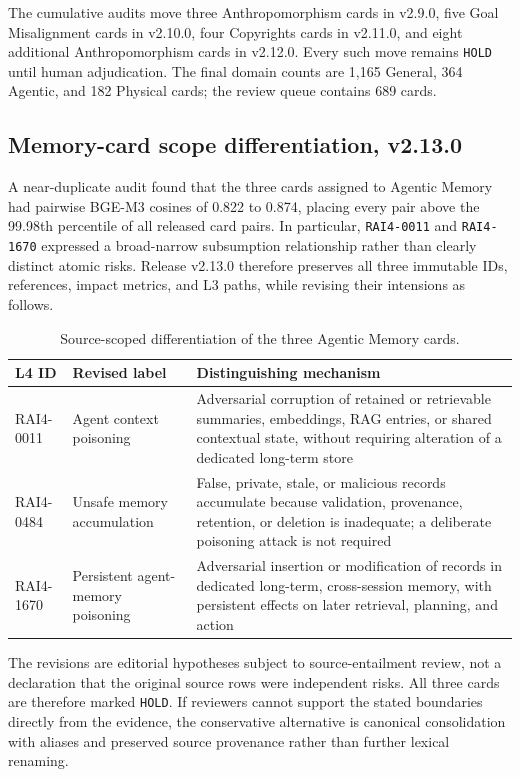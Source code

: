 \documentclass[11pt,a4paper]{article}
\newcommand{\code}[1]{\texttt{#1}}
\begin{document}
The cumulative audits move three Anthropomorphism cards in v2.9.0, five Goal
Misalignment cards in v2.10.0, four Copyrights cards in v2.11.0, and eight
additional Anthropomorphism cards in v2.12.0. Every such move remains
\code{HOLD} until human adjudication. The final domain counts are 1,165 General,
364 Agentic, and 182 Physical cards; the review queue contains 689 cards.

\subsection{Memory-card scope differentiation, v2.13.0}

A near-duplicate audit found that the three cards assigned to Agentic Memory
had pairwise BGE-M3 cosines of 0.822 to 0.874, placing every pair above the
99.98th percentile of all released card pairs. In particular,
\code{RAI4-0011} and \code{RAI4-1670} expressed a broad-narrow subsumption
relationship rather than clearly distinct atomic risks. Release v2.13.0
therefore preserves all three immutable IDs, references, impact metrics, and
L3 paths, while revising their intensions as follows.

\begin{table}[H]
\centering
\caption{Source-scoped differentiation of the three Agentic Memory cards.}
\small
\begin{tabularx}{\textwidth}{p{1.9cm} p{3.7cm} X}
\toprule
L4 ID & Revised label & Distinguishing mechanism \\
\midrule
RAI4-0011 & Agent context poisoning & Adversarial corruption of retained or
retrievable summaries, embeddings, RAG entries, or shared contextual state,
without requiring alteration of a dedicated long-term store \\
RAI4-0484 & Unsafe memory accumulation & False, private, stale, or malicious
records accumulate because validation, provenance, retention, or deletion is
inadequate; a deliberate poisoning attack is not required \\
RAI4-1670 & Persistent agent-memory poisoning & Adversarial insertion or
modification of records in dedicated long-term, cross-session memory, with
persistent effects on later retrieval, planning, and action \\
\bottomrule
\end{tabularx}
\end{table}

The revisions are editorial hypotheses subject to source-entailment review,
not a declaration that the original source rows were independent risks. All
three cards are therefore marked \code{HOLD}. If reviewers cannot support the
stated boundaries directly from the evidence, the conservative alternative is
canonical consolidation with aliases and preserved source provenance rather
than further lexical renaming.
\end{document}
